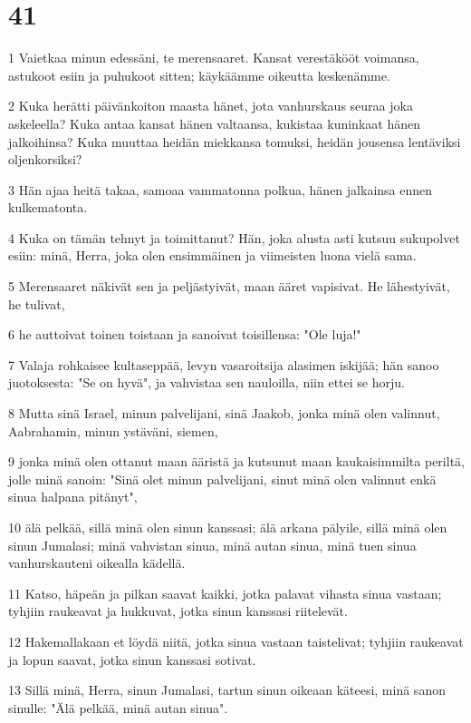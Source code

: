 \chapter{41}

\par 1 Vaietkaa minun edessäni, te merensaaret. Kansat verestäkööt voimansa, astukoot esiin ja puhukoot sitten; käykäämme oikeutta keskenämme.
\par 2 Kuka herätti päivänkoiton maasta hänet, jota vanhurskaus seuraa joka askeleella? Kuka antaa kansat hänen valtaansa, kukistaa kuninkaat hänen jalkoihinsa? Kuka muuttaa heidän miekkansa tomuksi, heidän jousensa lentäviksi oljenkorsiksi?
\par 3 Hän ajaa heitä takaa, samoaa vammatonna polkua, hänen jalkainsa ennen kulkematonta.
\par 4 Kuka on tämän tehnyt ja toimittanut? Hän, joka alusta asti kutsuu sukupolvet esiin: minä, Herra, joka olen ensimmäinen ja viimeisten luona vielä sama.
\par 5 Merensaaret näkivät sen ja peljästyivät, maan ääret vapisivat. He lähestyivät, he tulivat,
\par 6 he auttoivat toinen toistaan ja sanoivat toisillensa: "Ole luja!"
\par 7 Valaja rohkaisee kultaseppää, levyn vasaroitsija alasimen iskijää; hän sanoo juotoksesta: "Se on hyvä", ja vahvistaa sen nauloilla, niin ettei se horju.
\par 8 Mutta sinä Israel, minun palvelijani, sinä Jaakob, jonka minä olen valinnut, Aabrahamin, minun ystäväni, siemen,
\par 9 jonka minä olen ottanut maan ääristä ja kutsunut maan kaukaisimmilta periltä, jolle minä sanoin: "Sinä olet minun palvelijani, sinut minä olen valinnut enkä sinua halpana pitänyt",
\par 10 älä pelkää, sillä minä olen sinun kanssasi; älä arkana pälyile, sillä minä olen sinun Jumalasi; minä vahvistan sinua, minä autan sinua, minä tuen sinua vanhurskauteni oikealla kädellä.
\par 11 Katso, häpeän ja pilkan saavat kaikki, jotka palavat vihasta sinua vastaan; tyhjiin raukeavat ja hukkuvat, jotka sinun kanssasi riitelevät.
\par 12 Hakemallakaan et löydä niitä, jotka sinua vastaan taistelivat; tyhjiin raukeavat ja lopun saavat, jotka sinun kanssasi sotivat.
\par 13 Sillä minä, Herra, sinun Jumalasi, tartun sinun oikeaan käteesi, minä sanon sinulle: "Älä pelkää, minä autan sinua".
